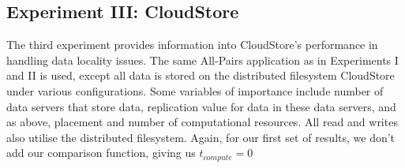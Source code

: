 \documentclass{rspublic}
\begin{document}
\subsection{Experiment III: CloudStore}\label{Sec:CloudStoreExp}
The third experiment provides information into CloudStore's performance
in handling data locality issues. The same All-Pairs application as in
Experiments I and II is used, except all data is stored on the
distributed filesystem CloudStore under various configurations. Some
variables of importance include number of data servers that store data,
replication value for data in these data servers, and as above,
placement and number of computational resources. All read and writes
also utilise the distributed filesystem. Again, for our first set of
results, we don't add our comparison function, giving us
$t_{compute}=0$ 
\begin{figure}
\begin{center}
\end{center}
\end{figure}
\end{document}
